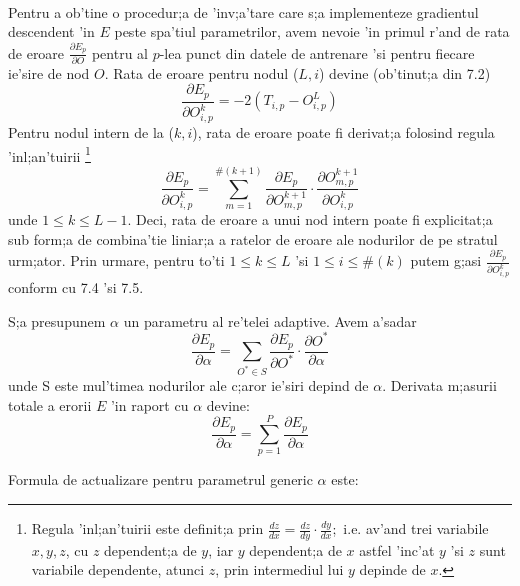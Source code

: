 \paragraph{}
Pentru a ob'tine o procedur;a de 'inv;a'tare care s;a implementeze gradientul descendent 'in $E$ peste spa'tiul parametrilor, avem nevoie 'in primul r'and de rata de eroare $\frac {\partial E_{p}} {\partial O}$ pentru al $p$-lea punct din datele de antrenare 'si pentru fiecare ie'sire de nod $O$. Rata de eroare pentru nodul ($L, i$) devine (ob'tinut;a din 7.2)
\begin{equation}
\frac {\partial E_{p}} {\partial O_{i, p}^{k}} = -2(T_{i, p} - O_{i, p}^{L})
\end{equation}
Pentru nodul intern de la ($k, i$), rata de eroare poate fi derivat;a folosind regula 'inl;an'tuirii \footnote{Regula 'inl;an'tuirii este definit;a prin $\frac{dz}{dx} = \frac{dz}{dy} \cdot \frac{dy}{dx}$;\ i.e. av'and trei variabile $x, y, z$, cu $z$ dependent;a de $y$, iar $y$ dependent;a de $x$ astfel 'inc'at $y$ 'si $z$ sunt variabile dependente, atunci $z$, prin intermediul lui $y$ depinde de $x$.}
\begin{equation}
\frac {\partial E_{p}} {\partial O_{i, p}^{k}} = \displaystyle \sum_{m = 1}^{\#(k+1)} \frac {\partial E_{p}} {\partial O_{m, p}^{k+1}} \cdot \frac {\partial O_{m, p}^{k+1}} {\partial O_{i, p}^{k}}
\end{equation}
unde $1 \leq k \leq L-1$. Deci, rata de eroare a unui nod intern poate fi explicitat;a sub form;a de combina'tie liniar;a a ratelor de eroare ale nodurilor de pe stratul urm;ator. Prin urmare, pentru to'ti $1 \leq k \leq L$ 'si $1 \leq i \leq \#(k)$ putem g;asi $\frac {\partial E_{p}} {\partial O_{i, p}^{k}}$ conform cu 7.4 'si 7.5.
\par
S;a presupunem $\alpha$ un parametru al re'telei adaptive. Avem a'sadar
\begin{equation}
\frac {\partial E_{p}} {\partial \alpha} = \displaystyle \sum_{O^{*} \in S} \frac {\partial E_{p}} {\partial O^{*}} \cdot \frac {\partial O^{*}} {\partial \alpha}
\end{equation}
unde S este mul'timea nodurilor ale c;aror ie'siri depind de $\alpha$. Derivata m;asurii totale a erorii $E$ 'in raport cu $\alpha$ devine:
\begin{equation}
\frac {\partial E_{p}} {\partial \alpha} = \displaystyle \sum_{p = 1}^{P} \frac {\partial E_{p}} {\partial \alpha}
\end{equation}
\par
Formula de actualizare pentru parametrul generic $\alpha$ este:
